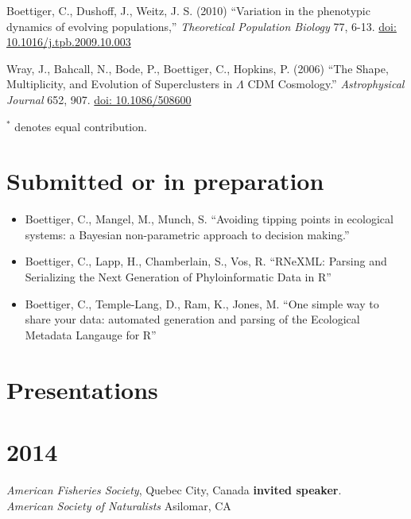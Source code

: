 \documentclass[margin]{res}
\begin{document}
\begin{resume}
\begin{etaremune}[start = 11]
\item Boettiger, C., Dushoff, J., Weitz, J. S. (2010) ``Variation in the phenotypic dynamics of evolving populations,'' {\it Theoretical Population Biology} 77, 6-13. \href{http://dx.doi.org/10.1016/j.tpb.2009.10.003}{doi: 10.1016/j.tpb.2009.10.003}
\item Wray, J., Bahcall, N., Bode, P., Boettiger, C., Hopkins, P.  (2006)  ``The Shape, Multiplicity, and Evolution of Superclusters in $\Lambda$ CDM Cosmology.''  {\it Astrophysical Journal} 652, 907. \href{http://dx.doi.org/10.1086/508600}{doi: 10.1086/508600}
\end{etaremune}
{ \footnotesize $^*$ denotes equal contribution.}

\section{Submitted or in preparation}


\begin{itemize} %
\item  Boettiger, C., Mangel, M., Munch, S. ``Avoiding tipping points in ecological systems: a Bayesian non-parametric approach to decision making.'' %

\item Boettiger, C., Lapp, H., Chamberlain, S., Vos, R. ``RNeXML: Parsing and Serializing the Next Generation of Phyloinformatic Data in R'' %

\item Boettiger, C., Temple-Lang, D., Ram, K., Jones, M. ``One simple way to share your data: automated generation and parsing of the Ecological Metadata Langauge for R''   %

\end{itemize} %


\section{Presentations} 
\section{\textnormal{2014}}
\emph{American Fisheries Society}, Quebec City, Canada \textbf{invited speaker}. \\ 
  \emph{American Society of Naturalists} Asilomar, CA \\ 

\end{resume}
\end{document}
